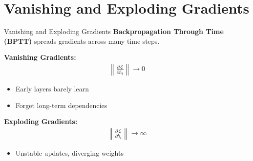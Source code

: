 \section{Vanishing and Exploding Gradients}
\begin{frame}{Vanishing and Exploding Gradients}
  \small
  \textbf{Backpropagation Through Time (BPTT)} spreads gradients across many time steps.
  
  \vspace{1em}
  {\color{red}\textbf{Vanishing Gradients:}}
  \begin{align*}
    \left\| \frac{\partial \mathcal{L}}{\partial h_t} \right\| \rightarrow 0
  \end{align*}
  \begin{itemize}
    \item[\textcolor{red}{$\blacktriangleright$}] Early layers barely learn
    \item[\textcolor{red}{$\blacktriangleright$}] Forget long-term dependencies
  \end{itemize}
  \vspace{0.5em}
  {\color{blue}\textbf{Exploding Gradients:}}
  \begin{align*}
    \left\| \frac{\partial \mathcal{L}}{\partial h_t} \right\| \rightarrow \infty
  \end{align*}
  \begin{itemize}
    \item[\textcolor{red}{$\blacktriangleright$}] Unstable updates, diverging weights
  \end{itemize}
\end{frame}

